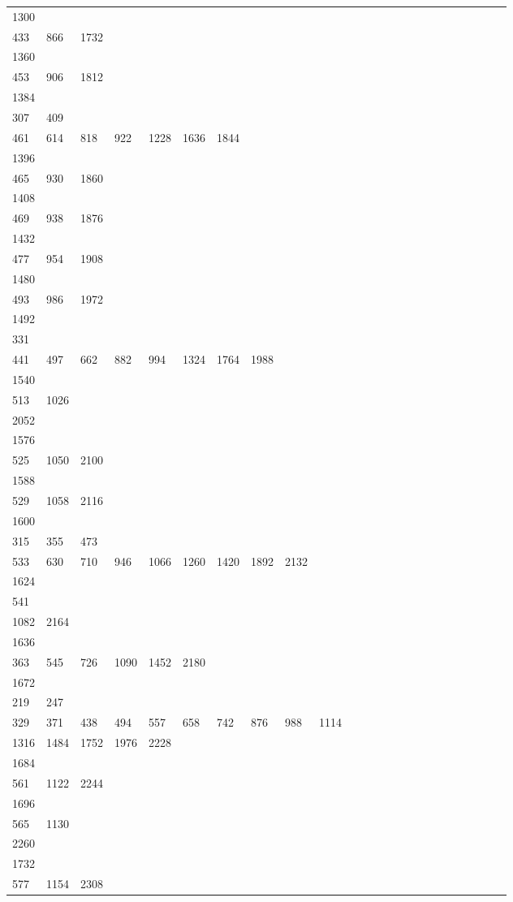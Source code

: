 \begin{longtable}{*{24}{l}}
1300&&&&&&&&&\\
433& 866& 1732& \\
1360&&&&&&&&&\\
453& 906& 1812& \\
1384&&&&&&&&&\\
307& 409\\
461& 614& 818& 922& 1228& 1636& 1844& \\
1396&&&&&&&&&\\
465& 930& 1860\\
1408&&&&&&&&&\\
469& 938& 1876& \\
1432&&&&&&&&&\\
477& 954& 1908& \\
1480&&&&&&&&&\\
493& 986& 1972& \\
1492&&&&&&&&&\\
331\\
441& 497& 662& 882& 994& 1324& 1764& 1988& \\
1540&&&&&&&&&\\
513& 1026\\
2052& \\
1576&&&&&&&&&\\
525& 1050& 2100& \\
1588&&&&&&&&&\\
529& 1058& 2116& \\
1600&&&&&&&&&\\
315& 355& 473\\
533& 630& 710& 946& 1066& 1260& 1420& 1892& 2132& \\
1624&&&&&&&&&\\
541\\
1082& 2164& \\
1636&&&&&&&&&\\
363& 545& 726& 1090& 1452& 2180& \\
1672&&&&&&&&&\\
219& 247\\
329& 371& 438& 494& 557& 658& 742& 876& 988& 1114\\
1316& 1484& 1752& 1976& 2228& \\
1684&&&&&&&&&\\
561& 1122& 2244& \\
1696&&&&&&&&&\\
565& 1130\\
2260& \\
1732&&&&&&&&&\\
577& 1154& 2308& \\

\end{longtable}
